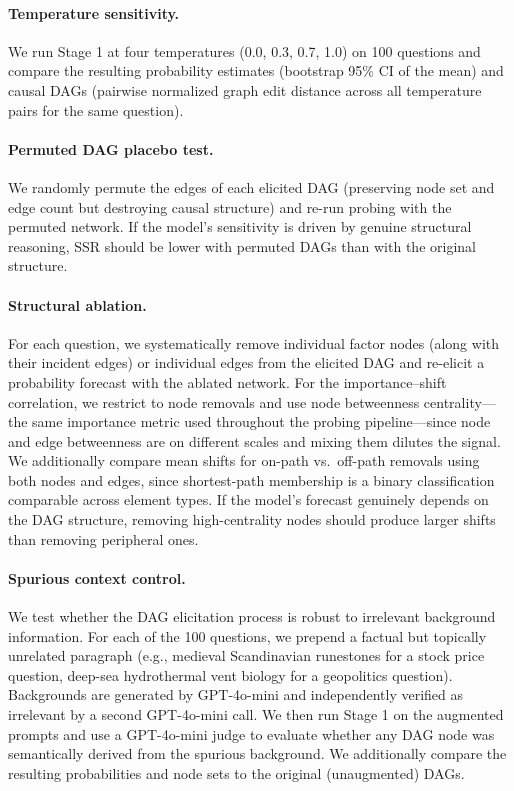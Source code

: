 \documentclass[11pt]{article}
\begin{document}
\paragraph{Temperature sensitivity.} We run Stage 1 at four temperatures (0.0, 0.3, 0.7, 1.0) on 100 questions and compare the resulting probability estimates (bootstrap 95\% CI of the mean) and causal DAGs (pairwise normalized graph edit distance across all temperature pairs for the same question).

\paragraph{Permuted DAG placebo test.} We randomly permute the edges of each elicited DAG (preserving node set and edge count but destroying causal structure) and re-run probing with the permuted network. If the model's sensitivity is driven by genuine structural reasoning, SSR should be lower with permuted DAGs than with the original structure.

\paragraph{Structural ablation.} For each question, we systematically remove individual factor nodes (along with their incident edges) or individual edges from the elicited DAG and re-elicit a probability forecast with the ablated network. For the importance--shift correlation, we restrict to node removals and use node betweenness centrality---the same importance metric used throughout the probing pipeline---since node and edge betweenness are on different scales and mixing them dilutes the signal. We additionally compare mean shifts for on-path vs.\ off-path removals using both nodes and edges, since shortest-path membership is a binary classification comparable across element types. If the model's forecast genuinely depends on the DAG structure, removing high-centrality nodes should produce larger shifts than removing peripheral ones.

\paragraph{Spurious context control.} We test whether the DAG elicitation process is robust to irrelevant background information. For each of the 100 questions, we prepend a factual but topically unrelated paragraph (e.g., medieval Scandinavian runestones for a stock price question, deep-sea hydrothermal vent biology for a geopolitics question). Backgrounds are generated by GPT-4o-mini and independently verified as irrelevant by a second GPT-4o-mini call. We then run Stage 1 on the augmented prompts and use a GPT-4o-mini judge to evaluate whether any DAG node was semantically derived from the spurious background. We additionally compare the resulting probabilities and node sets to the original (unaugmented) DAGs.
\end{document}
